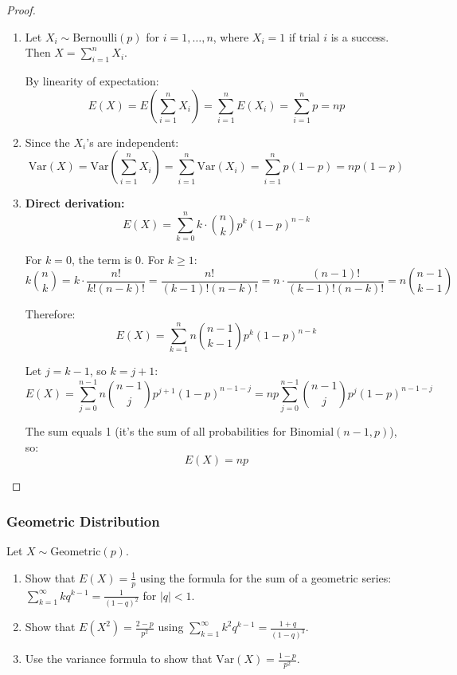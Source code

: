 \begin{proof}
\begin{enumerate}[label=(\alph*)]
    \item Let \(X_i \sim \text{Bernoulli}(p)\) for \(i = 1, \ldots, n\), where \(X_i = 1\) if trial \(i\) is a success. Then \(X = \sum_{i=1}^{n} X_i\).
    
    By linearity of expectation:
    \[
    E(X) = E\left(\sum_{i=1}^{n} X_i\right) = \sum_{i=1}^{n} E(X_i) = \sum_{i=1}^{n} p = np
    \]
    
    \item Since the \(X_i\)'s are independent:
    \[
    \text{Var}(X) = \text{Var}\left(\sum_{i=1}^{n} X_i\right) = \sum_{i=1}^{n} \text{Var}(X_i) = \sum_{i=1}^{n} p(1-p) = np(1-p)
    \]
    
    \item \textbf{Direct derivation:}
    \[
    E(X) = \sum_{k=0}^{n} k \cdot \binom{n}{k} p^k (1-p)^{n-k}
    \]
    
    For \(k = 0\), the term is 0. For \(k \geq 1\):
    \[
    k \binom{n}{k} = k \cdot \frac{n!}{k!(n-k)!} = \frac{n!}{(k-1)!(n-k)!} = n \cdot \frac{(n-1)!}{(k-1)!(n-k)!} = n \binom{n-1}{k-1}
    \]
    
    Therefore:
    \[
    E(X) = \sum_{k=1}^{n} n \binom{n-1}{k-1} p^k (1-p)^{n-k}
    \]
    
    Let \(j = k-1\), so \(k = j+1\):
    \[
    E(X) = \sum_{j=0}^{n-1} n \binom{n-1}{j} p^{j+1} (1-p)^{n-1-j} = np \sum_{j=0}^{n-1} \binom{n-1}{j} p^j (1-p)^{n-1-j}
    \]
    
    The sum equals 1 (it's the sum of all probabilities for \(\text{Binomial}(n-1, p)\)), so:
    \[
    E(X) = np
    \]
\end{enumerate}
\end{proof}

\subsubsection{Geometric Distribution}

\begin{exercise}
Let \(X \sim \text{Geometric}(p)\).

\begin{enumerate}[label=(\alph*)]
    \item Show that \(E(X) = \frac{1}{p}\) using the formula for the sum of a geometric series: \(\sum_{k=1}^{\infty} k q^{k-1} = \frac{1}{(1-q)^2}\) for \(|q| < 1\).
    \item Show that \(E(X^2) = \frac{2-p}{p^2}\) using \(\sum_{k=1}^{\infty} k^2 q^{k-1} = \frac{1+q}{(1-q)^3}\).
    \item Use the variance formula to show that \(\text{Var}(X) = \frac{1-p}{p^2}\).
\end{enumerate}
\end{exercise}

